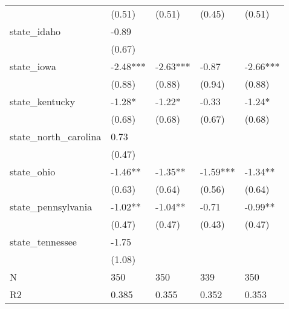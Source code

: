 \begin{table}
\begin{center}
\begin{tabular}{lllll}
                                          & (0.51)              & (0.51)               & (0.45)                & (0.51)                  \\
state\_idaho                              & -0.89               &                      &                       &                         \\
                                          & (0.67)              &                      &                       &                         \\
state\_iowa                               & -2.48***            & -2.63***             & -0.87                 & -2.66***                \\
                                          & (0.88)              & (0.88)               & (0.94)                & (0.88)                  \\
state\_kentucky                           & -1.28*              & -1.22*               & -0.33                 & -1.24*                  \\
                                          & (0.68)              & (0.68)               & (0.67)                & (0.68)                  \\
state\_north\_carolina                    & 0.73                &                      &                       &                         \\
                                          & (0.47)              &                      &                       &                         \\
state\_ohio                               & -1.46**             & -1.35**              & -1.59***              & -1.34**                 \\
                                          & (0.63)              & (0.64)               & (0.56)                & (0.64)                  \\
state\_pennsylvania                       & -1.02**             & -1.04**              & -0.71                 & -0.99**                 \\
                                          & (0.47)              & (0.47)               & (0.43)                & (0.47)                  \\
state\_tennessee                          & -1.75               &                      &                       &                         \\
                                          & (1.08)              &                      &                       &                         \\
N                                         & 350                 & 350                  & 339                   & 350                     \\
R2                                        & 0.385               & 0.355                & 0.352                 & 0.353                   \\
\hline
\end{tabular}
\end{center}
\end{table}
